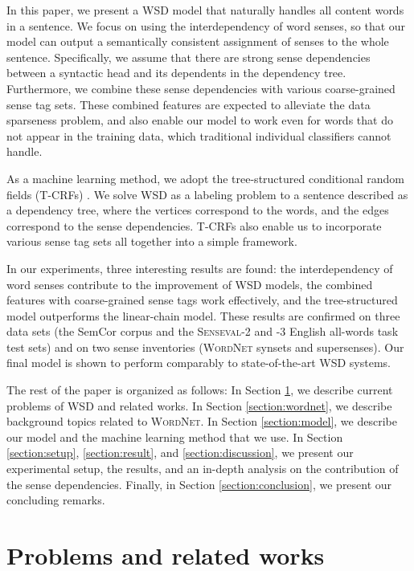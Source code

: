 \documentclass[english]{jnlp_1.4}
\begin{document}
In this paper, we present a WSD model that naturally handles all content words in a sentence.
We focus on using the interdependency of word senses, so that our model can output a semantically consistent assignment of senses to the whole sentence.
Specifically, we assume that there are strong sense dependencies between a syntactic head and its dependents in the dependency tree.
Furthermore, we combine these sense dependencies with various coarse-grained sense tag sets.
These combined features are expected to alleviate the data sparseness problem, and also enable our model to work even for words that do not appear in the training data, which traditional individual classifiers cannot handle.


As a machine learning method, we adopt the tree-structured conditional random fields (T-CRFs) \cite{tang:2006}.
We solve WSD as a labeling problem to a sentence described as a dependency tree, where the vertices correspond to the words, and the edges correspond to the sense dependencies.
T-CRFs also enable us to incorporate various sense tag sets all together into a simple framework.


In our experiments, three interesting results are found: the interdependency of word senses contribute to the improvement of WSD models, the combined features with coarse-grained sense tags work effectively, and the tree-structured model outperforms the linear-chain model.
These results are confirmed on three data sets (the SemCor corpus and the \textsc{Senseval}-2 and -3 English all-words task test sets) and on two sense inventories (\textsc{WordNet} synsets and supersenses).
Our final model is shown to perform comparably to state-of-the-art WSD systems.


The rest of the paper is organized as follows:
In Section \ref{section:problem}, we describe current problems of WSD and related works.
In Section \ref{section:wordnet}, we describe background topics related to \textsc{WordNet}.
In Section \ref{section:model}, we describe our model and the machine learning method that we use.
In Section \ref{section:setup}, \ref{section:result}, and \ref{section:discussion}, we present our experimental setup, the results, and an in-depth analysis on the contribution of the sense dependencies.
Finally, in Section \ref{section:conclusion}, we present our concluding remarks.




\section{Problems and related works}
\label{section:problem}
\end{document}
